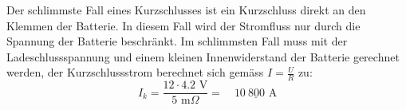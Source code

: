 Der schlimmste Fall eines Kurzschlusses ist ein Kurzschluss direkt an den Klemmen der Batterie. In diesem Fall wird der Stromfluss nur durch die Spannung der Batterie beschränkt. Im schlimmsten Fall muss mit der Ladeschlussspannung und einem kleinen Innenwiderstand der Batterie gerechnet werden, der Kurzschlussstrom berechnet sich gemäss $I=\frac{U}{R}$ zu:
\begin{equation*}
	I_k=\frac{12\cdot 4.2\text{ V}}{5\text{ m}\Omega}=\quad\underline{10\ 800\text{ A}}
\end{equation*}

\newpage